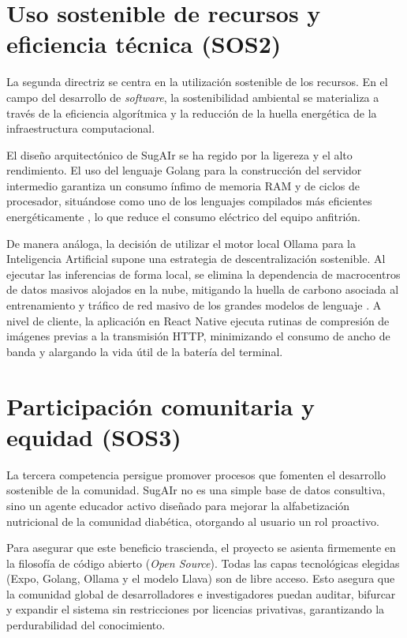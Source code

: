 \section{Uso sostenible de recursos y eficiencia técnica (SOS2)}
La segunda directriz se centra en la utilización sostenible de los recursos. En el campo del desarrollo de \textit{software}, la sostenibilidad ambiental se materializa a través de la eficiencia algorítmica y la reducción de la huella energética de la infraestructura computacional.

El diseño arquitectónico de SugAIr se ha regido por la ligereza y el alto rendimiento. El uso del lenguaje Golang para la construcción del servidor intermedio garantiza un consumo ínfimo de memoria RAM y de ciclos de procesador, situándose como uno de los lenguajes compilados más eficientes energéticamente \cite{pereira2017energy}, lo que reduce el consumo eléctrico del equipo anfitrión. 

De manera análoga, la decisión de utilizar el motor local Ollama para la Inteligencia Artificial supone una estrategia de descentralización sostenible. Al ejecutar las inferencias de forma local, se elimina la dependencia de macrocentros de datos masivos alojados en la nube, mitigando la huella de carbono asociada al entrenamiento y tráfico de red masivo de los grandes modelos de lenguaje \cite{strubell2019energy}. A nivel de cliente, la aplicación en React Native ejecuta rutinas de compresión de imágenes previas a la transmisión HTTP, minimizando el consumo de ancho de banda y alargando la vida útil de la batería del terminal.

\section{Participación comunitaria y equidad (SOS3)}
La tercera competencia persigue promover procesos que fomenten el desarrollo sostenible de la comunidad. SugAIr no es una simple base de datos consultiva, sino un agente educador activo diseñado para mejorar la alfabetización nutricional de la comunidad diabética, otorgando al usuario un rol proactivo.

Para asegurar que este beneficio trascienda, el proyecto se asienta firmemente en la filosofía de código abierto (\textit{Open Source}). Todas las capas tecnológicas elegidas (Expo, Golang, Ollama y el modelo Llava) son de libre acceso. Esto asegura que la comunidad global de desarrolladores e investigadores puedan auditar, bifurcar y expandir el sistema sin restricciones por licencias privativas, garantizando la perdurabilidad del conocimiento.

